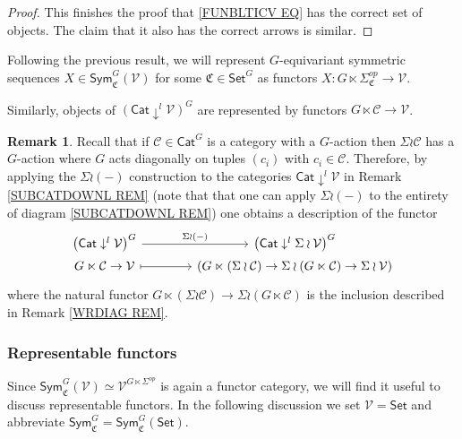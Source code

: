 \documentclass[a4paper,10pt
,draft
]{article}%
\numberwithin{equation}{section}
\numberwithin{figure}{section}
\theoremstyle{definition} %
\newtheorem{remark}[equation]{Remark}%
\newcommand{\V}{\ensuremath{\mathcal V}}
\newcommand{\1}{\ensuremath{\mathbbm 1}}%
\begin{document}
\begin{proof}
This finishes the proof that \eqref{FUNBLTICV EQ} has the correct set of objects. The claim that it also has the correct arrows is similar.
\end{proof}



Following the previous result, 
we will represent $G$-equivariant symmetric sequences
$X \in \mathsf{Sym}^G_{\mathfrak{C}}(\mathcal{V})$
for some $\mathfrak{C} \in \mathsf{Set}^G$
as functors
$X \colon G \ltimes \Sigma_{\mathfrak{C}}^{op} \to \mathcal{V}$.

Similarly, objects of
$\left( \mathsf{Cat} \downarrow^{l} \mathcal{V} \right)^G$
are represented by functors $G \ltimes \mathcal{C} \to \V$.


\begin{remark}\label{RHOPURP REM}
Recall that if $\mathcal{C}\in \mathsf{Cat}^G$
is a category with a $G$-action then 
$\Sigma \wr \mathcal{C}$
has a $G$-action where $G$ acts diagonally on tuples $(c_i)$ with $c_i \in \mathcal{C}$.
Therefore, by applying the 
$\Sigma \wr (-)$
construction to the categories
$\mathsf{Cat} \downarrow^l \V$
in Remark \ref{SUBCATDOWNL REM}
(note that that one can apply $\Sigma \wr (-)$
to the entirety of diagram \eqref{SUBCATDOWNL REM})
one obtains a description of the functor
\begin{equation}\label{RHOPURP EQ}
\begin{tikzcd}[column sep =40,row sep =0]
	\left( \mathsf{Cat} \downarrow^{l} \mathcal{V} \right)^G
	\ar{r}{\Sigma \wr (-) } &
	\left( \mathsf{Cat} \downarrow^{l} \Sigma \wr \mathcal{V} \right)^G
\\
	G \ltimes \mathcal{C} \to \mathcal{V} \ar[mapsto]{r} &
	\left(G \ltimes (\Sigma \wr \mathcal{C}) \to 
	\Sigma \wr (G \ltimes  \mathcal{C}) \to \Sigma \wr \mathcal{V}\right)
\end{tikzcd}
\end{equation}
where the natural functor
$G \ltimes (\Sigma \wr \mathcal{C}) \to 
\Sigma \wr (G \ltimes  \mathcal{C})$
is the inclusion described in Remark \ref{WRDIAG REM}.
\end{remark}


\subsubsection{Representable functors}
\label{REPFUN_SEC}

Since  
$\mathsf{Sym}^G_{\mathfrak{C}}(\mathcal{V}) \simeq 
\V^{G \ltimes \Sigma^{op}}$ is again a functor category, 
we will find it useful to discuss representable functors.
In the following discussion 
we set $\V = \mathsf{Set}$ and abbreviate
$\mathsf{Sym}^G_{\mathfrak{C}} = \mathsf{Sym}^G_{\mathfrak{C}}(\mathsf{Set})$.
\end{document}
